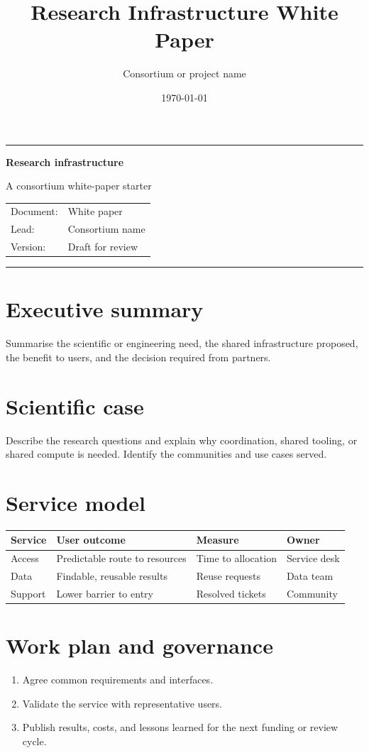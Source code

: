 \documentclass[11pt,a4paper]{article}
\title{Research Infrastructure White Paper}\author{Consortium or project name}\date{\today}
\begin{document}
\begin{titlepage}\color{prace}\rule{\textwidth}{2pt}\par\vspace{1.3cm}
{\Huge\bfseries Research infrastructure\par}{\Large A consortium white-paper starter\par}\vfill
\begin{tabular}{@{}ll@{}}Document: & White paper\\Lead: & Consortium name\\Version: & Draft for review\end{tabular}
\vspace{1.3cm}\par\color{prace}\rule{\textwidth}{2pt}\end{titlepage}
\section*{Executive summary}
Summarise the scientific or engineering need, the shared infrastructure
proposed, the benefit to users, and the decision required from partners.
\section{Scientific case}
Describe the research questions and explain why coordination, shared tooling,
or shared compute is needed. Identify the communities and use cases served.
\section{Service model}
\begin{tabularx}{\textwidth}{@{}lXll@{}}\toprule Service & User outcome & Measure & Owner\\\midrule
 Access & Predictable route to resources & Time to allocation & Service desk\\
 Data & Findable, reusable results & Reuse requests & Data team\\
 Support & Lower barrier to entry & Resolved tickets & Community\\\bottomrule\end{tabularx}
\section{Work plan and governance}
\begin{enumerate}\item Agree common requirements and interfaces.\item Validate
the service with representative users.\item Publish results, costs, and
lessons learned for the next funding or review cycle.\end{enumerate}
\end{document}
